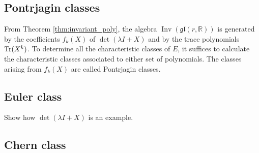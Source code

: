 \subsection{Pontrjagin classes}
From Theorem \ref{thm:invariant_poly}, the algebra
$\operatorname{Inv}(\mathfrak{gl}(r,\mathbb{R}))$ is generated by the
coefficients $f_k(X)$ of  $\det(\lambda I + X)$ and by the trace polynomials
$\operatorname{Tr}(X^{k})$. To determine all the characteristic classes of $E$, it suffices to
calculate the characteristic classes associated to either set of polynomials.
The classes arising from $f_k(X)$ are called Pontrjagin classes.



\subsection{Euler class}
Show how $\det(\lambda I + X)$ is an example.

\subsection{Chern class}


